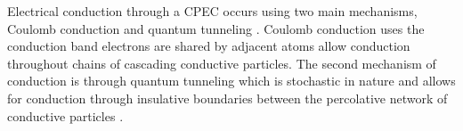 Electrical conduction through a CPEC occurs using two main mechanisms, Coulomb conduction and quantum tunneling \cite{Bloor2006,Duan2014,Zhang2007,Madrid2017}. Coulomb conduction uses the conduction band electrons are shared by adjacent atoms allow conduction throughout chains of cascading conductive particles. The second mechanism of conduction is through quantum tunneling which is stochastic in nature and allows for conduction through insulative boundaries between the percolative network of conductive particles \cite{Hu2008,Grimaldi2006}.




